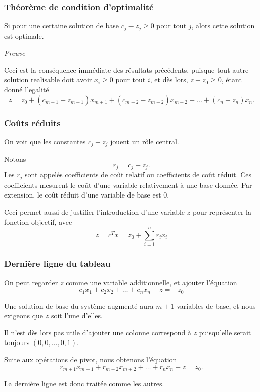 \documentclass[t,usepdftitle=false]{beamer}
\begin{document}
\begin{frame}
\frametitle{Théorème de condition d'optimalité}

Si pour une certaine solution de base $c_j - z_j \geq 0$ pour tout $j$, alors cette solution est optimale.

\mbox{}

\textit{Preuve}

Ceci est la conséquence immédiate des résultats précédents, puisque tout autre solution realisable doit avoir $x_i \geq 0$ pour tout $i$, et dès lors, $z - z_0 \geq 0$, étant donné l'egalité
\[
z = z_0 + (c_{m+1} - z_{m+1})x_{m+1}
+ (c_{m+2} - z_{m+2})x_{m+2} + \ldots
+ (c_{n} - z_n) x_{n}.
\]
\end{frame}

\begin{frame}
\frametitle{Coûts réduits}

On voit que les constantes $c_j - z_j$ jouent un rôle central.

\mbox{}

Notons
\[
r_j = c_j - z_j.
\] 
Les $r_j$ sont appelés coefficients de {\color{blue}coût relatif} ou coefficients de {\color{blue}coût réduit}. Ces coefficients mesurent le coût d'une variable relativement à une base donnée. Par extension, le coût réduit d'une variable de base est 0.

\mbox{}

Ceci permet aussi de justifier l'introduction d'une variable $z$ pour représenter la fonction objectif, avec
$$
z = c^Tx = z_0 + \sum_{i = 1}^n r_i x_i
$$

\end{frame}

\begin{frame}
	\frametitle{Dernière ligne du tableau}
	
	On peut regarder $z$ comme une variable additionnelle, et ajouter l'équation
	\[
	c_1x_1 + c_2x_2 + \ldots + c_nx_n - z = -z_0
	\]
	
	\mbox{}
	
	Une solution de base du système augmenté aura $m+1$ variables de base, et nous exigeons que $z$ soit l'une d'elles.
	
	\mbox{}
	
	Il n'est dès lors pas utile d'ajouter une colonne correspond à $z$ puisqu'elle serait toujours $(0, 0, \ldots, 0, 1)$.
	
	\mbox{}
	
	Suite aux opérations de pivot, nous obtenons l'équation
	\[
	r_{m+1}x_{m+1} + r_{m+2}x_{m+2} + \ldots + r_nx_n - z = z_0.
	\]
	
	\mbox{}
	
	La dernière ligne est donc traitée comme les autres.
	
\end{frame}
\end{document}
